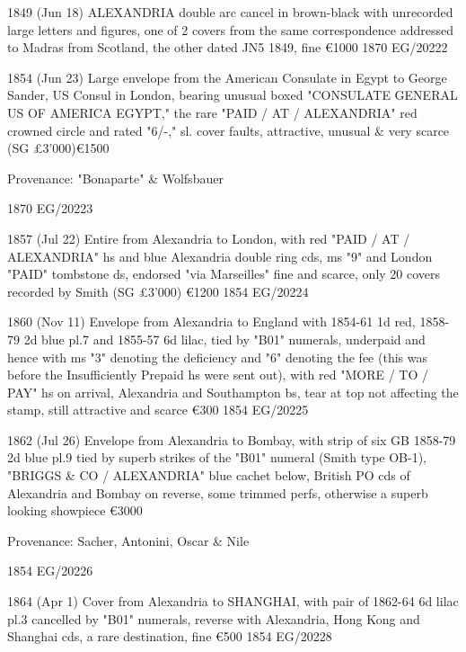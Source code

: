 \documentclass[justified]{tufte-book}
\begin{document}
%
{1849 (Jun 18) ALEXANDRIA double arc cancel in brown-black with unrecorded large letters and figures, one of 2 covers from the same correspondence addressed to Madras from Scotland, the other dated JN5 1849, fine \euro 1000
}
{1870}%
{EG/20222}%
{}%
{}
{}%
{}


%
{1854 (Jun 23) Large envelope from the American Consulate in Egypt to George Sander, US Consul in London, bearing unusual boxed "CONSULATE GENERAL US OF AMERICA EGYPT," the rare "PAID / AT / ALEXANDRIA" red crowned circle and rated "6/-," sl. cover faults, attractive, unusual \& very scarce (SG £3'000)\euro 1500

Provenance: "Bonaparte" \& Wolfsbauer
}
{1870}%
{EG/20223}%
{}%
{}
{}%
{}

%
{1857 (Jul 22) Entire from Alexandria to London, with red "PAID / AT / ALEXANDRIA" hs and blue Alexandria double ring cds, ms "9" and London "PAID" tombstone ds, endorsed "via Marseilles" fine and scarce, only 20 covers recorded by Smith (SG £3'000) \euro 1200
}
{1854}%
{EG/20224}%
{}%
{}
{}%
{}

%
{1860 (Nov 11) Envelope from Alexandria to England with 1854-61 1d red, 1858-79 2d blue pl.7 and 1855-57 6d lilac, tied by "B01" numerals, underpaid and hence with ms "3" denoting the deficiency and "6" denoting the fee (this was before the Insufficiently Prepaid hs were sent out), with red "MORE / TO / PAY" hs on arrival, Alexandria and Southampton bs, tear at top not affecting the stamp, still attractive and scarce \euro300
}
{1854}%
{EG/20225}%
{}%
{}
{}%
{}

%
{1862 (Jul 26) Envelope from Alexandria to Bombay, with strip of six GB 1858-79 2d blue pl.9 tied by superb strikes of the "B01" numeral (Smith type OB-1), "BRIGGS \& CO / ALEXANDRIA" blue cachet below, British PO cds of Alexandria and Bombay on reverse, some trimmed perfs, otherwise a superb looking showpiece \euro3000

Provenance: Sacher, Antonini, Oscar \& Nile
}
{1854}%
{EG/20226}%
{}%
{}
{}%
{}

%
{1864 (Apr 1) Cover from Alexandria to SHANGHAI, with pair of 1862-64 6d lilac pl.3 cancelled by "B01" numerals, reverse with Alexandria, Hong Kong and Shanghai cds, a rare destination, fine \euro500
}
{1854}%
{EG/20228}%
{}%
{}
{}%
{}
\end{document}
